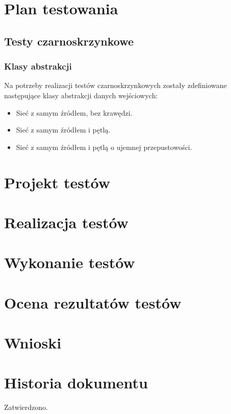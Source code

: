 \documentclass[10pt]{dokument-tiwo}
\begin{document}
\MakeDokumentMeta


\section{Plan testowania}
  \subsection{Testy czarnoskrzynkowe}
    \subsubsection{Klasy abstrakcji}
    Na potrzeby realizacji testów czarnoskrzynkowych zostały zdefiniowane\\następujące klasy abstrakcji danych wejściowych:
    \begin{itemize}
    \item Sieć z samym źródłem, bez krawędzi.
    \item Sieć z samym źródłem i pętlą.
    \item Sieć z samym źródłem i pętlą o ujemnej przepustowości.


    \end{itemize}

\section{Projekt testów}


\section{Realizacja testów}


\section{Wykonanie testów}


\section{Ocena rezultatów testów}


\section{Wnioski}


\newpage
\section*{Historia dokumentu}
\begin{versions}
        Zatwierdzono.
\end{versions}
\end{document}
